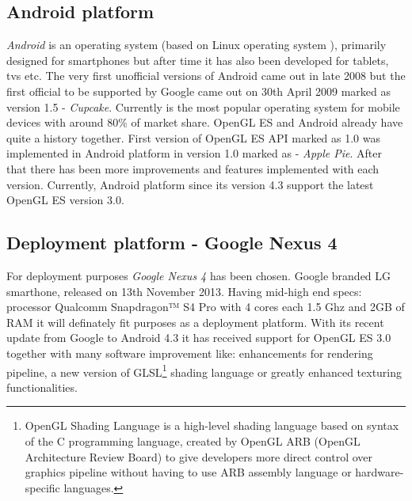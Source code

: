 \subsection{Android platform}
\emph{Android} \cite{androidcom} is an operating system (based on Linux operating system \cite{gnulinux}), primarily designed for smartphones but after time it has also been developed for tablets, tvs etc.
The very first unofficial versions of Android came out in late 2008 but the first official to be supported by Google came out on 30th April 2009 marked as version 1.5 - \emph{Cupcake}.
\newline Currently is the most popular operating system for mobile devices with around 80\% of market share.
OpenGL ES and Android already have quite a history together.
First version of OpenGL ES API marked as 1.0 was implemented in Android platform in version 1.0 marked as - \emph{Apple Pie}.
After that there has been more improvements and features implemented with each version.
Currently, Android platform since its version 4.3 support the latest OpenGL ES version 3.0.

\subsection{Deployment platform - Google Nexus 4}
For deployment purposes \emph{Google Nexus 4} has been chosen.
Google branded LG smarthone, released on 13th November 2013.
\newline Having mid-high end specs: processor Qualcomm Snapdragon™ S4 Pro with 4 cores each 1.5 Ghz and 2GB of RAM it will definately fit purposes as a deployment platform.
\newline With its recent update from Google to Android 4.3 it has received support for OpenGL ES 3.0 together with many software improvement like: enhancements for rendering pipeline, a new version of GLSL\footnote{OpenGL Shading Language is a high-level shading language based on syntax of the C programming language, created by OpenGL ARB (OpenGL Architecture Review Board) to give developers more direct control over graphics pipeline without having to use ARB assembly language or hardware-specific languages.} shading language or greatly enhanced texturing functionalities.